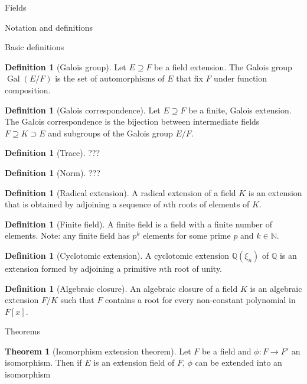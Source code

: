 \documentclass{article}
\theoremstyle{definition}
\newtheorem{theorem}{Theorem}
\numberwithin{theorem}{subsection} %
\theoremstyle{definition}
\newtheorem{definition}[paragraph]{Definition}
\newcommand{\Gal}{\operatorname{Gal}}
\newcommand{\Q}{\mathbb Q}
\newcommand{\fn}[3]{{#1 \colon #2 \rightarrow #3}}
\begin{document}
\begin{section}{Fields}
\begin{subsection}{Notation and definitions}
\begin{subsubsection}{Basic definitions}
      \begin{definition}[Galois group]
        Let $E \supseteq F$ be a field extension. The Galois group $\Gal(E/F)$
        is the set of automorphisms of $E$ that fix $F$ under function
        composition.
      \end{definition}
      \begin{definition}[Galois correspondence]
        Let $E \supseteq F$ be a finite, Galois extension.
        The Galois correspondence is the bijection between intermediate fields
        $F \supseteq K \supset E$ and subgroups of the Galois group $E/F$.
      \end{definition}
      \begin{definition}[Trace]
        ???
      \end{definition}
      \begin{definition}[Norm]
        ???
      \end{definition}
      \begin{definition}[Radical extension]
        A radical extension of a field $K$ is an extension that is obtained by
        adjoining a sequence of $n$th roots of elements of $K$.
      \end{definition}
      \begin{definition}[Finite field]
        A finite field is a field with a finite number of elements.
        Note: any finite field has $p^k$ elements for some prime $p$ and
        $k \in \mathbb N$.
      \end{definition}
      \begin{definition}[Cyclotomic extension]
        A cyclotomic extension $\Q(\xi_n)$ of $\Q$ is an extension formed by
        adjoining a primitive $n$th root of unity.
      \end{definition}
      \begin{definition}[Algebraic closure]
        An algebraic closure of a field $K$ is an algebraic extension $F/K$
        such that $F$ contains a root for every non-constant polynomial in
        $F[x]$.
      \end{definition}
    \end{subsubsection}
  \end{subsection}
  \begin{subsection}{Theorems}
    \begin{theorem}[Isomorphism extension theorem]
      Let $F$ be a field and $\fn \phi F {F'}$ an isomorphism. Then if $E$ is an
      extension field of $F$, $\phi$ can be extended into an isomorphism

\end{theorem}
\end{subsection}
\end{section}
\end{document}
